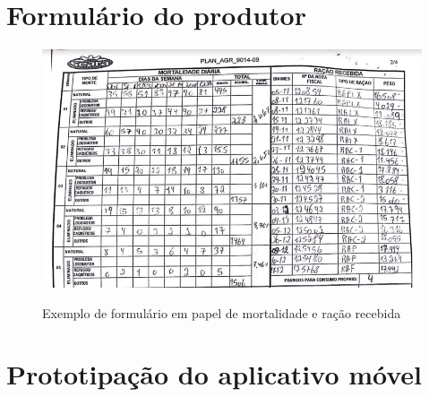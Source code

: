 
\begin{anexosenv}
\partanexos

\chapter{Formulário do produtor}     %
\label{chap:anexoA}

\begin{figure}[!htb]
    \centering
    \caption{Exemplo de formulário em papel de mortalidade e ração recebida}
    \includegraphics[width=1.0\textwidth]{./dados/figuras/planilha_mortalidade.png}
    \label{fig:planilha_mortalidade}
\end{figure}

\chapter{Prototipação do aplicativo móvel}     %
\label{chap:anexoA}


\end{anexosenv}

